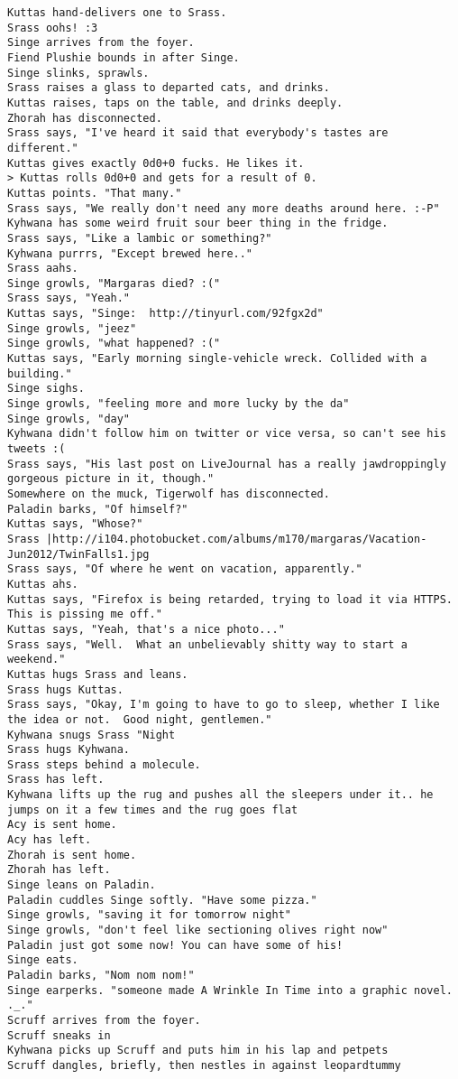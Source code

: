 \begin{verbatim}
Kuttas hand-delivers one to Srass.
Srass oohs! :3
Singe arrives from the foyer.
Fiend Plushie bounds in after Singe.
Singe slinks, sprawls.
Srass raises a glass to departed cats, and drinks.
Kuttas raises, taps on the table, and drinks deeply.
Zhorah has disconnected.
Srass says, "I've heard it said that everybody's tastes are different."
Kuttas gives exactly 0d0+0 fucks. He likes it.
> Kuttas rolls 0d0+0 and gets for a result of 0.
Kuttas points. "That many."
Srass says, "We really don't need any more deaths around here. :-P"
Kyhwana has some weird fruit sour beer thing in the fridge.
Srass says, "Like a lambic or something?"
Kyhwana purrrs, "Except brewed here.."
Srass aahs.
Singe growls, "Margaras died? :("
Srass says, "Yeah."
Kuttas says, "Singe:  http://tinyurl.com/92fgx2d"
Singe growls, "jeez"
Singe growls, "what happened? :("
Kuttas says, "Early morning single-vehicle wreck. Collided with a building."
Singe sighs.
Singe growls, "feeling more and more lucky by the da"
Singe growls, "day"
Kyhwana didn't follow him on twitter or vice versa, so can't see his tweets :(
Srass says, "His last post on LiveJournal has a really jawdroppingly gorgeous picture in it, though."
Somewhere on the muck, Tigerwolf has disconnected.
Paladin barks, "Of himself?"
Kuttas says, "Whose?"
Srass |http://i104.photobucket.com/albums/m170/margaras/Vacation-Jun2012/TwinFalls1.jpg
Srass says, "Of where he went on vacation, apparently."
Kuttas ahs.
Kuttas says, "Firefox is being retarded, trying to load it via HTTPS. This is pissing me off."
Kuttas says, "Yeah, that's a nice photo..."
Srass says, "Well.  What an unbelievably shitty way to start a weekend."
Kuttas hugs Srass and leans.
Srass hugs Kuttas.
Srass says, "Okay, I'm going to have to go to sleep, whether I like the idea or not.  Good night, gentlemen."
Kyhwana snugs Srass "Night
Srass hugs Kyhwana.
Srass steps behind a molecule.
Srass has left.
Kyhwana lifts up the rug and pushes all the sleepers under it.. he jumps on it a few times and the rug goes flat
Acy is sent home.
Acy has left.
Zhorah is sent home.
Zhorah has left.
Singe leans on Paladin.
Paladin cuddles Singe softly. "Have some pizza."
Singe growls, "saving it for tomorrow night"
Singe growls, "don't feel like sectioning olives right now"
Paladin just got some now! You can have some of his!
Singe eats.
Paladin barks, "Nom nom nom!"
Singe earperks. "someone made A Wrinkle In Time into a graphic novel. ._."
Scruff arrives from the foyer.
Scruff sneaks in
Kyhwana picks up Scruff and puts him in his lap and petpets
Scruff dangles, briefly, then nestles in against leopardtummy

\end{verbatim}
